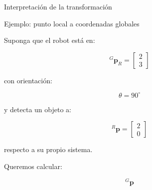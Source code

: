 \documentclass[aspectratio=169]{beamer}
\begin{document}
\begin{frame}{Interpretación de la transformación}


    \vspace{0.3cm}


\end{frame}

\begin{frame}{Ejemplo: punto local a coordenadas globales}

    Suponga que el robot está en:

    \[
    {}^{G}\mathbf{p}_R
    =
    \begin{bmatrix}
        2\\
        3
    \end{bmatrix}
    \]

    con orientación:

    \[
    \theta=90^\circ
    \]

    y detecta un objeto a:

    \[
    {}^{R}\mathbf{p}
    =
    \begin{bmatrix}
        2\\
        0
    \end{bmatrix}
    \]

    respecto a su propio sistema.

    Queremos calcular:

    \[
    {}^{G}\mathbf{p}
    \]

\end{frame}
\end{document}
